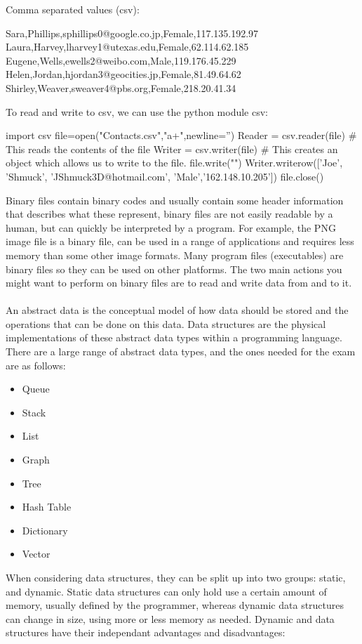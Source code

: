   Comma separated values (csv):
  \begin{csv}
Sara,Phillips,sphillips0@google.co.jp,Female,117.135.192.97
Laura,Harvey,lharvey1@utexas.edu,Female,62.114.62.185
Eugene,Wells,ewells2@weibo.com,Male,119.176.45.229
Helen,Jordan,hjordan3@geocities.jp,Female,81.49.64.62
Shirley,Weaver,sweaver4@pbs.org,Female,218.20.41.34 	\end{csv}
  To read and write to csv, we can use the python module csv:
  \begin{python}
import csv
file=open("Contacts.csv","a+",newline='')
Reader = csv.reader(file) # This reads the contents of the file
Writer = csv.writer(file) # This creates an object which allows us to write to the file.
file.write("\n")
Writer.writerow(['Joe', 'Shmuck', 'JShmuck3D@hotmail.com', 'Male','162.148.10.205'])
file.close()	\end{python}
  Binary files contain binary codes and usually contain some header information that describes what these represent, binary files are not easily readable by a human, but can quickly be interpreted by a program. For example, the PNG image file is a binary file, can be used in a range of applications and requires less memory than some other image formats. Many program files (executables) are binary files so they can be used on other platforms. The two main actions you might want to perform on binary files are to read and write data from and to it.\\ \\
  An abstract data is the conceptual model of how data should be stored and the operations that can be done on this data. Data structures are the physical implementations of these abstract data types within a programming language. There are a large range of abstract data types, and the ones needed for the exam are as follows:
  \begin{itemize}
  	\item Queue
  	\item Stack
  	\item List
  	\item Graph
  	\item Tree
  	\item Hash Table
  	\item Dictionary
  	\item Vector
  \end{itemize}
  When considering data structures, they can be split up into two groups: static, and dynamic. Static data structures can only hold use a certain amount of memory, usually defined by the programmer, whereas dynamic data structures can change in size, using more or less memory as needed. Dynamic and data structures have their independant advantages and disadvantages:
